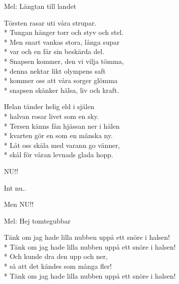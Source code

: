 \begin{SongText}
\begin{SongInfo}
    Mel: Längtan till landet
\end{SongInfo}
\begin{SongVerse}
    Törsten rasar uti våra strupar.\\*%
    Tungan hänger torr och styv och stel.\\*%
    Men snart vankas stora, långa supar\\*%
    var och en får sin beskärda del.\\*%
    Snapsen kommer, den vi vilja tömma,\\*%
    denna nektar likt olympens saft\\*%
    kommer oss att våra sorger glömma\\*%
    snapsen skänker hälsa, liv och kraft.
\end{SongVerse}
\begin{SongVerse}
    Helan tänder helig eld i själen\\*%
    halvan rosar livet som en sky.\\*%
    Tersen känns fån hjässan ner i hälen\\*%
    kvarten gör en som en mänska ny.\\*%
    Låt oss skåla med varann go vänner,\\*%
    skål för våran levnads glada hopp.
\end{SongVerse}
\end{SongText}
\begin{SongText}
\begin{SongVerse}
    NU!!
\end{SongVerse}
\end{SongText}
\begin{SongText}
\begin{SongVerse}
    Int nu..
\end{SongVerse}
\begin{SongVerse}
    Men NU!!
\end{SongVerse}
\end{SongText}
\begin{SongText}[Snöret]
\begin{SongInfo}
    Mel: Hej tomtegubbar
\end{SongInfo}
\begin{SongVerse}
    Tänk om jag hade lilla nubben uppå ett snöre i halsen!\\*%
    Tänk om jag hade lilla nubben uppå ett snöre i halsen!\\*%
    Och kunde dra den upp och ner,\\*%
    så att det kändes som många fler!\\*%
    Tänk om jag hade lilla nubben uppå ett snöre i halsen!
\end{SongVerse}
\end{SongText}
